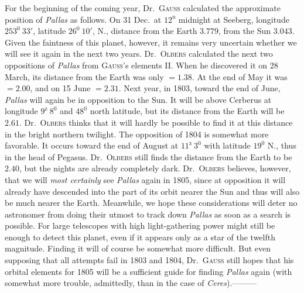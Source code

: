For the beginning of the coming year, Dr.\ \textsc{Gauss} calculated the approximate position of \textit{Pallas} as follows. On 31 Dec.\ at $12^{\mathrm{u}}$ midnight at Seeberg, longitude $253^0\ 33'$, latitude $26^0\ 10'$, N., distance from the Earth $3.779$, from the Sun $3.043$. Given the faintness of this planet, however, it remains very uncertain whether we will see it again
%
in the next two years. Dr.\ \textsc{Olbers} calculated the next two oppositions of \textit{Pallas} from \textsc{Gauss}’s elements II. When he discovered it on 28 March, its distance from the Earth was only $=1.38$. At the end of May it was $=2.00$, and on 15 June $=2.31$. Next year, in 1803, toward the end of June, \textit{Pallas} will again be in opposition to the Sun. It will be above Cerberus at longitude $9^{\mathrm{z}}\ 8^0$ and $48^0$ north latitude, but its distance from the Earth will be $2.61$. Dr.\ \textsc{Olbers} thinks that it will hardly be possible to find it at this distance in the bright northern twilight. The opposition of 1804 is somewhat more favorable. It occurs toward the end of August at $11^{\mathrm{z}}\ 3^0$ with latitude $19^0$ N., thus in the head of Pegasus. Dr.\ \textsc{Olbers} still finds the distance from the Earth to be $2.40$, but the nights are already completely dark. Dr.\ \textsc{Olbers} believes, however, that we will \textit{most certainly} see \textit{Pallas} again in 1805, since at opposition it will already have descended into the part of its orbit nearer the Sun and thus will also be much nearer the Earth. Meanwhile, we hope these considerations will deter no astronomer from doing their utmost to track down \textit{Pallas} as soon as a search is possible. For large telescopes with high light-gathering power might still be enough to detect this planet, even if it appears only as a star of the twelfth magnitude. Finding it will of course be somewhat more difficult. But even supposing that all attempts fail in 1803 and 1804, Dr.\ \textsc{Gauss} still hopes that his orbital elements for 1805 will be a sufficient guide for finding \textit{Pallas} again (with somewhat more trouble, admittedly, than in the case of \textit{Ceres}).\quad —\quad —\quad —

